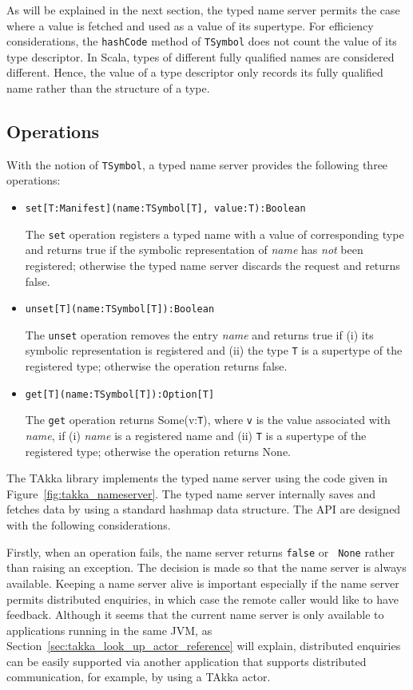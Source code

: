 As will be explained in the next section, the typed name server permits
the case where a value is fetched and used as a value of its supertype.  
For efficiency considerations, the {\tt hashCode} method of {\tt TSymbol} 
does not count the value of its type descriptor.
In Scala, types of different fully qualified names are considered different.
Hence, the value of a type descriptor only records its fully qualified name
rather than the structure of a type.


\subsection{Operations}

With the notion of {\tt TSymbol}, a typed name server provides 
the following three operations:
\begin{itemize}
  \item {\tt set[T:Manifest](name:TSymbol[T], value:T):Boolean}

The {\tt set} operation registers a typed name with a value of corresponding 
type and returns true if the symbolic representation of {\it name} has {\it 
not} been registered; otherwise the typed name server discards the request and
returns false.


  \item {\tt unset[T](name:TSymbol[T]):Boolean}

The {\tt unset} operation removes the entry {\it name} and returns true if (i) 
its symbolic representation is registered and (ii) the type {\tt T} is a 
supertype of the registered type; otherwise the operation returns false.

  \item {\tt get[T](name:TSymbol[T]):Option[T]}

The {\tt get} operation returns Some(v:{\tt T}), where {\tt v} is the value 
associated with {\it name}, if (i) {\it name} is a registered name and (ii) 
{\tt T} is a supertype of the registered type; otherwise the operation returns 
None.
\end{itemize}

The TAkka library implements the typed name server using the code given in 
Figure~\ref{fig:takka_nameserver}.  The typed name server internally saves and 
fetches data by using a standard hashmap data structure.  The API are designed 
with the following considerations.  

Firstly, when an operation fails, the name server returns {\tt false} or {\tt 
None} rather than raising an exception.  The decision is made so that the name 
server is always available.  Keeping a name server alive is important 
especially if the name server permits distributed enquiries, in which case the 
remote caller would like to have feedback.  Although it seems that the 
current name server is only available to applications running in the same JVM, 
as Section~\ref{sec:takka_look_up_actor_reference} will explain, distributed 
enquiries can be easily supported via another application that supports 
distributed communication, for example, by using a TAkka actor.

